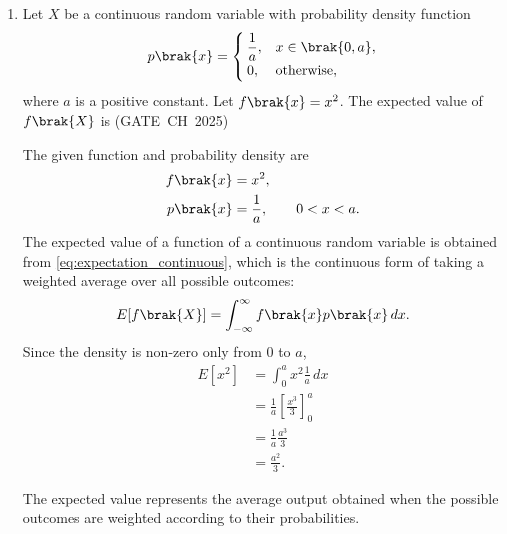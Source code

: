 \begin{enumerate}[label=\thesubsection.\arabic*, ref=\thesubsection.\theenumi,itemsep=0pt]
The code to verify this is:
\begin{lstlisting}[frame=single, basicstyle=\rmfamily, escapeinside={(*@}{@*)}]
(*@\makebox[\dimexpr\linewidth-2\fboxsep-2\fboxrule\relax][c]{codes/q36/main.py}@*)
\end{lstlisting}

\item Let $X$ be a continuous random variable with probability density function
\begin{align}
p\brak{x}=\begin{cases}
\dfrac{1}{a}, & x\in\brak{0,a},\\
0, & \text{otherwise},
\end{cases}
\end{align}
where $a$ is a positive constant. Let $f\brak{x}=x^2$. The expected value of $f\brak{X}$ is \hfill (GATE~CH~2025)
\begin{enumerate}[itemsep=0pt]
\end{enumerate}

\solution The given function and probability density are
\begin{align}
f\brak{x}&=x^2,\\
p\brak{x}&=\frac1a,\qquad 0<x<a.
\end{align}
The expected value of a function of a continuous random variable is obtained from \eqref{eq:expectation_continuous}, which is the continuous form of taking a weighted average over all possible outcomes:
\begin{align}
E[f\brak{X}]=\int_{-\infty}^{\infty}f\brak{x}p\brak{x}\,dx.
\end{align}
Since the density is non-zero only from $0$ to $a$,
\begin{align}
E[x^2]
&=\int_0^a x^2\frac1a\,dx\\
&=\frac1a\left[\frac{x^3}{3}\right]_0^a\\
&=\frac1a\frac{a^3}{3}\\
&=\frac{a^2}{3}.
\end{align}

The expected value represents the average output obtained when the possible outcomes are weighted according to their probabilities.



\end{enumerate}
